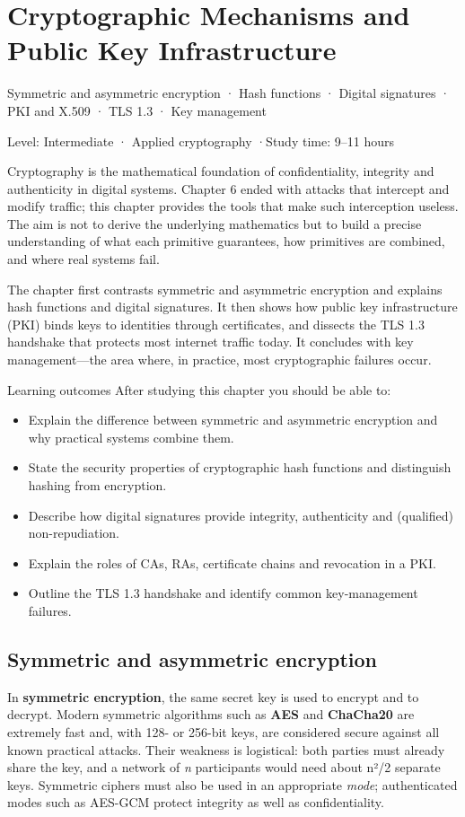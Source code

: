 \documentclass[11pt,openany]{book}
\newcommand{\chaptermeta}[3]{%
  {\sffamily\small\color{accent}#1\par}\vspace{0.3em}
  {\sffamily\footnotesize\color{gray}#2 \quad·\quad #3\par}\vspace{1.2em}}
\begin{document}
\chapter{Cryptographic Mechanisms and Public Key Infrastructure}\label{ch:7}
\chaptermeta{Symmetric and asymmetric encryption · Hash functions · Digital signatures · PKI and X.509 · TLS 1.3 · Key management}{Level: Intermediate · Applied cryptography}{Study time: 9–11 hours}

Cryptography is the mathematical foundation of confidentiality, integrity and authenticity in digital systems. Chapter 6 ended with attacks that intercept and modify traffic; this chapter provides the tools that make such interception useless. The aim is not to derive the underlying mathematics but to build a precise understanding of what each primitive guarantees, how primitives are combined, and where real systems fail.

The chapter first contrasts symmetric and asymmetric encryption and explains hash functions and digital signatures. It then shows how public key infrastructure (PKI) binds keys to identities through certificates, and dissects the TLS 1.3 handshake that protects most internet traffic today. It concludes with key management—the area where, in practice, most cryptographic failures occur.

\begin{outcomesbox}{Learning outcomes}
After studying this chapter you should be able to:
\begin{itemize}
  \item Explain the difference between symmetric and asymmetric encryption and why practical systems combine them.
  \item State the security properties of cryptographic hash functions and distinguish hashing from encryption.
  \item Describe how digital signatures provide integrity, authenticity and (qualified) non-repudiation.
  \item Explain the roles of CAs, RAs, certificate chains and revocation in a PKI.
  \item Outline the TLS 1.3 handshake and identify common key-management failures.
\end{itemize}
\end{outcomesbox}

\section{Symmetric and asymmetric encryption}\label{sec:7.1}
In \textbf{symmetric encryption}, the same secret key is used to encrypt and to decrypt. Modern symmetric algorithms such as \textbf{AES} and \textbf{ChaCha20} are extremely fast and, with 128- or 256-bit keys, are considered secure against all known practical attacks. Their weakness is logistical: both parties must already share the key, and a network of \emph{n} participants would need about n²/2 separate keys. Symmetric ciphers must also be used in an appropriate \emph{mode}; authenticated modes such as AES-GCM protect integrity as well as confidentiality.
\end{document}
